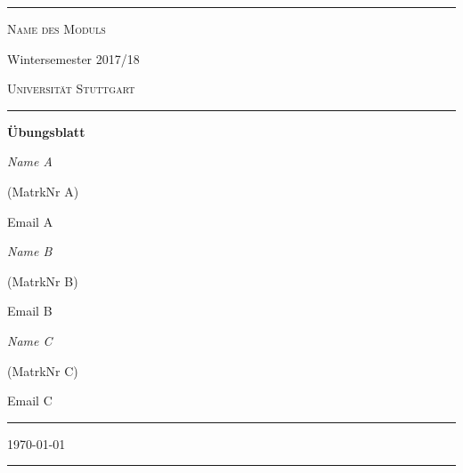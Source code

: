 \documentclass[12pt]{article} %
\newcounter{sheetnr}
\newcommand{\namei}{Name A} %
\newcommand{\matrknri}{MatrkNr A} %
\newcommand{\emaili}{Email A} %
\newcommand{\nameii}{Name B} %
\newcommand{\matrknrii}{MatrkNr B} %
\newcommand{\emailii}{Email B} %
\newcommand{\nameiii}{Name C} %
\newcommand{\matrknriii}{MatrkNr C} %
\newcommand{\emailiii}{Email C} %
\begin{document}


\begin{titlepage}
	\centering
	\rule{12cm}{1.0pt} %
	
	{\scshape\LARGE Name des Moduls \par}
	
	\vspace{0.5cm} %
	
	{\Large Wintersemester 2017/18}
	
	\vspace{1.5cm} %
	
	{\scshape\Large Universität Stuttgart\par}
	
	\vspace{1.0cm} %
	
	\rule{8cm}{0.6pt} %
	
	{\huge\bfseries Übungsblatt \thesheetnr \par}
	
	\vspace{2cm} %
	
	{\Large\itshape \namei} %
	{\Large (\matrknri)\par} %
	{\large \emaili \par} %
	
	\vspace{0.5cm} %
	
	{\Large\itshape \nameii} %
	{\Large (\matrknrii)\par} %
	{\large \emailii \par} %
	
	\vspace{0.5cm} %
	
	{\Large\itshape \nameiii} %
	{\Large (\matrknriii)\par} %
	{\large \emailiii \par} %
	
	\vspace{0.5cm} %
	
	\rule{8cm}{0.6pt} %
	
	\vspace{2cm} %
	
	{\Large \today\par} %
	
	\rule{12cm}{1.0pt} %
	
\end{titlepage}
\end{document}
